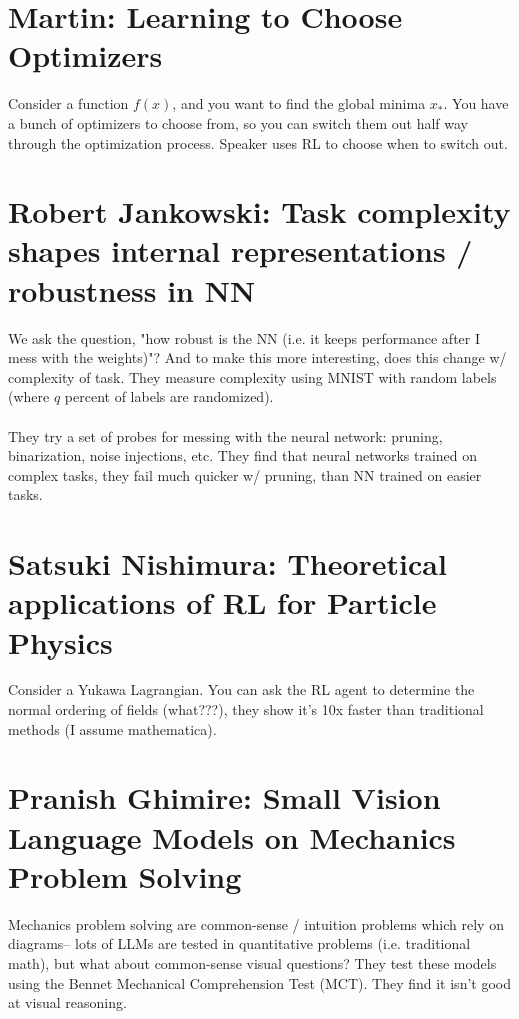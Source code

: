 \section{Martin: Learning to Choose Optimizers}
Consider a function $f(x)$, and you want to find the global minima $x_*$. You have a bunch of optimizers to choose from, so you can switch them out half way through the optimization process. Speaker uses RL to choose when to switch out.

\section{Robert Jankowski: Task complexity shapes internal representations / robustness in NN}
We ask the question, "how robust is the NN (i.e. it keeps performance after I mess with the weights)"? And to make this more interesting, does this change w/ complexity of task. They measure complexity using MNIST with random labels (where $q$ percent of labels are randomized).\\
\\
They try a set of probes for messing with the neural network: pruning, binarization, noise injections, etc. They find that neural networks trained on complex tasks, they fail much quicker w/ pruning, than NN trained on easier tasks.

\section{Satsuki Nishimura: Theoretical applications of RL for Particle Physics}
Consider a Yukawa Lagrangian. You can ask the RL agent to determine the normal ordering of fields (what???), they show it's 10x faster than traditional methods (I assume mathematica).

\section{Pranish Ghimire: Small Vision Language Models on Mechanics Problem Solving}
Mechanics problem solving are common-sense / intuition problems which rely on diagrams-- lots of LLMs are tested in quantitative problems (i.e. traditional math), but what about common-sense visual questions? They test these models using the Bennet Mechanical Comprehension Test (MCT). They find it isn't good at visual reasoning.

